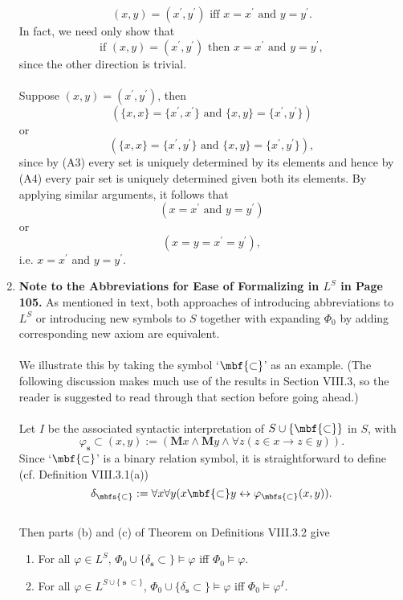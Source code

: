 \begin{enumerate}[1.]
\[
\mbox{$(x,y) = (x^\prime, y^\prime)$ iff $x = x^\prime$ and $y = y^\prime$.}
\]
In fact, we need only show that
\[
\mbox{if $(x, y) = (x^\prime, y^\prime)$ then $x = x^\prime$ and $y = y^\prime$},
\]
since the other direction is trivial.\\
\\
Suppose $(x,y) = (x^\prime, y^\prime)$, then
\[
(\mbox{$\{x, x\} = \{x^\prime, x^\prime\}$ and $\{x, y\} = \{x^\prime, y^\prime\}$})
\]
or
\[
(\mbox{$\{x, x\} = \{x^\prime, y^\prime\}$ and $\{x, y\} = \{x^\prime, y^\prime\}$}),
\]
since by (A3) every set is uniquely determined by its elements and hence by (A4) every pair set is uniquely determined given both its elements. By applying similar arguments, it follows that
\[
(\mbox{$x = x^\prime$ and $y = y^\prime$})
\]
or
\[
(\mbox{$x = y = x^\prime = y^\prime$}),
\]
i.e. $x = x^\prime$ and $y = y^\prime$.
%
\item \textbf{Note to the Abbreviations for Ease of Formalizing in $L^S$ in Page 105.} As mentioned in text, both approaches of introducing abbreviations to $L^S$ or introducing new symbols to $S$ together with expanding $\Phi_0$ by adding corresponding new axiom are equivalent.\\
\\
We illustrate this by taking the symbol `$\mbf{\subset}$' as an example. (The following discussion makes much use of the results in Section VIII.3, so the reader is suggested to read through that section before going ahead.)\\
\\
Let $I$ be the associated syntactic interpretation of $S \cup \{ \mbf{\subset} \}$ in $S$, with
\[
\varphi_\mbfs{\subset}(x, y) := (\mathbf{M}x \land \mathbf{M}y \land \forall z (z \in x \rightarrow z \in y)).
\]
Since `$\mbf{\subset}$' is a binary relation symbol, it is straightforward to define (cf. Definition VIII.3.1(a))
\[
\delta_\mbfs{\subset} := \forall x \forall y (x \mbf{\subset} y \leftrightarrow \varphi_\mbfs{\subset}(x, y)).
\]
\\
Then parts (b) and (c) of Theorem on Definitions VIII.3.2 give
\begin{enumerate}[(1)]
\item For all $\varphi \in L^S$, $\Phi_0 \cup \{ \delta_\mbfs{\subset} \} \models \varphi$ iff $\Phi_0 \models \varphi$.
\item For all $\varphi \in L^{S \cup \{ \mbfs{\subset} \}}$, $\Phi_0 \cup \{ \delta_\mbfs{\subset} \} \models \varphi$ iff $\Phi_0 \models \varphi^I$.
\end{enumerate}
\end{enumerate}
